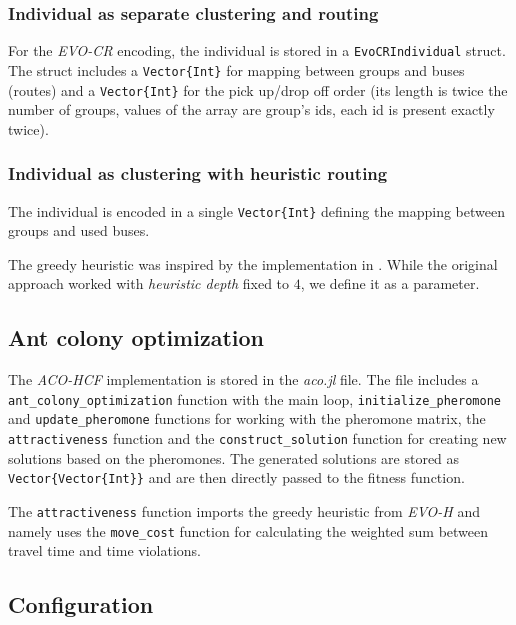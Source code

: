 \subsubsection{Individual as separate clustering and routing}

For the \textit{EVO-CR} encoding, the individual is stored in a \texttt{EvoCRIndividual} struct. The struct includes a \texttt{Vector\{Int\}} for mapping between groups and buses (routes) and a \texttt{Vector\{Int\}} for the pick up/drop off order (its length is twice the number of groups, values of the array are group's ids, each id is present exactly twice).

\subsubsection{Individual as clustering with heuristic routing}

The individual is encoded in a single \texttt{Vector\{Int\}} defining the mapping between groups and used buses.

The greedy heuristic was inspired by the implementation in \cite{Baugh1998INTRACTABILITYOT}. While the original approach worked with \textit{heuristic depth} fixed to $4$, we define it as a parameter.

\subsection{Ant colony optimization}

The \textit{ACO-HCF} implementation is stored in the \textit{aco.jl} file. The file includes a \texttt{ant\_colony\_optimization} function with the main loop, \texttt{initialize\_pheromone} and \texttt{update\_pheromone} functions for working with the pheromone matrix, the \texttt{attractiveness} function and the \texttt{construct\_solution} function for creating new solutions based on the pheromones. The generated solutions are stored as \texttt{Vector\{Vector\{Int\}\}} and are then directly passed to the fitness function.

The \texttt{attractiveness} function imports the greedy heuristic from \textit{EVO-H} and namely uses the \texttt{move\_cost} function for calculating the weighted sum between travel time and time violations.

\subsection{Configuration}

